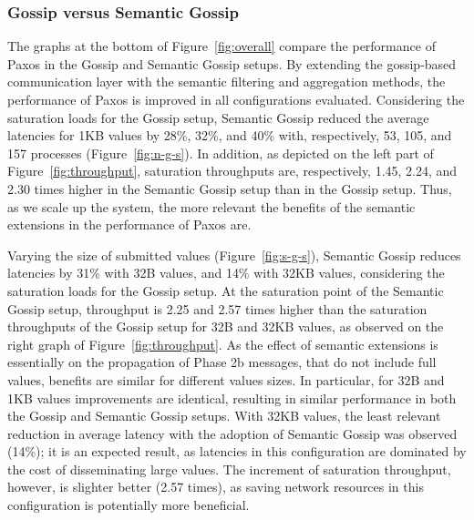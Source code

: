 \subsubsection{Gossip versus Semantic Gossip}
\label{sec:gossipvssgossip}

The graphs at the bottom of Figure~\ref{fig:overall} compare the performance of
Paxos in the Gossip and Semantic Gossip setups.
By extending the gossip-based communication layer with the semantic filtering and
aggregation methods, the performance of Paxos is improved in all
configurations evaluated.
Considering the saturation loads for the Gossip setup, Semantic Gossip reduced the
average latencies for 1KB values by 28\%, 32\%, and 40\% with, respectively,
53, 105, and 157 processes (Figure~\ref{fig:n-g-s}).
In addition, as depicted on the left part of Figure~\ref{fig:throughput},
saturation throughputs are, respectively, 1.45, 2.24, and 2.30 times higher in
the Semantic Gossip setup than in the Gossip setup.
%
Thus, as we scale up the system, the more relevant the benefits of the
semantic extensions in the performance of Paxos are.

Varying the size of submitted values (Figure~\ref{fig:s-g-s}), Semantic Gossip
reduces latencies by 31\% with 32B values, and 14\% with 32KB values,
considering the saturation loads for the Gossip setup.
At the saturation point of the Semantic Gossip setup, throughput is 2.25 and
2.57 times higher than the saturation throughputs of the Gossip setup for 32B
and 32KB values, as observed on the right graph of Figure~\ref{fig:throughput}.
%
As the effect of semantic extensions is essentially on the propagation of Phase 2b
messages, that do not include full values, benefits are similar for different
values sizes.
%
In particular, for 32B and 1KB values improvements are identical, resulting in
similar performance in both the Gossip and Semantic Gossip setups.
With 32KB values, the least relevant reduction in average latency with the
adoption of Semantic Gossip was observed (14\%); it is an expected result, as
latencies in this configuration are dominated by the cost of disseminating
large values.
%
The increment of saturation throughput, however, is slighter better (2.57
times), as saving network resources in this configuration is potentially more
beneficial.

